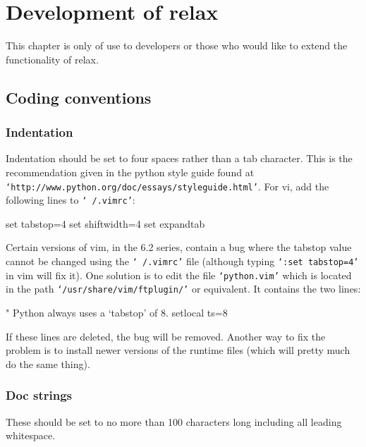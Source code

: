 
\chapter{Development of relax}

This chapter is only of use to developers or those who would like to extend the functionality of relax.



\section{Coding conventions}


\subsection{Indentation}

Indentation should be set to four spaces rather than a tab character.  This is the recommendation given in the python style guide found at \texttt{`http://www.python.org/doc/essays/styleguide.html'}.  For vi, add the following lines to \texttt{`~/.vimrc'}:

set tabstop=4
set shiftwidth=4
set expandtab

Certain versions of vim, in the 6.2 series, contain a bug where the tabstop value cannot be changed using the \texttt{`~/.vimrc'} file (although typing \texttt{`:set tabstop=4'} in vim will fix it).  One solution is to edit the file \texttt{`python.vim'} which is located in the path \texttt{`/usr/share/vim/ftplugin/'} or equivalent. It contains the two lines:

\begin{exampleenv}
" Python always uses a `tabstop' of 8.
setlocal ts=8
\end{exampleenv}

If these lines are deleted, the bug will be removed.  Another way to fix the problem is to install newer versions of the runtime files (which will pretty much do the same thing).


\subsection{Doc strings}

These should be set to no more than 100 characters long including all leading whitespace.
